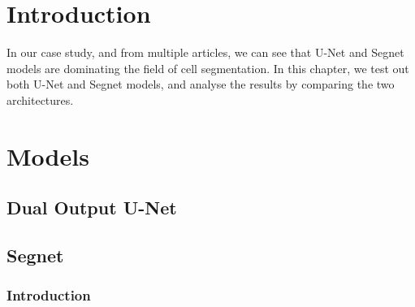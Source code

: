 \section{Introduction}
\vspace{0.2in}
\hspace*{0.16in}
In our case study, and from multiple articles, we can see that U-Net and Segnet models are dominating the field of cell segmentation.
In this chapter, we test out both U-Net and Segnet models, and analyse the results by comparing the two architectures.

\section{Models}
\vspace{0.2in}
\hspace*{0.16in}
\lipsum[3-3]

\subsection{Dual Output U-Net}
\lipsum[3-6]

\subsection{Segnet}
\lipsum[3-6]
\subsubsection{Introduction}
\lipsum[2-2]
